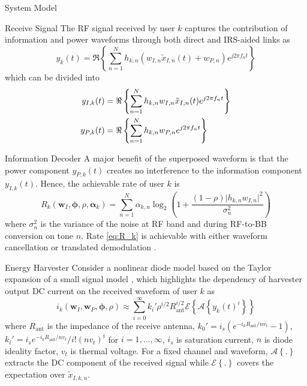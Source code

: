 \documentclass{IEEEtran}
\begin{document}
\begin{section}{System Model}
	\begin{subsection}{Receive Signal}
		The RF signal received by user $k$ captures the contribution of information and power waveforms through both direct and IRS-aided links as
		\begin{equation}\label{eq:y_k}
			y_k(t)=\Re\left\{\sum_{n=1}^N{h_{{k,n}}}\left({w_{I,n}\tilde{x}_{I,n}(t)}+w_{P,n}\right){e^{j2{\pi}{f_n}{t}}}\right\}
		\end{equation}
		which can be divided into
		\begin{align}\label{eq:y_{I/P,k}}
			y_{I,k}(t) & = \Re\left\{\sum_{n=1}^N{h_{{k,n}}}{w_{I,n}\tilde{x}_{I,n}(t)}{e^{j2{\pi}{f_n}{t}}}\right\}\\
			y_{P,k}(t) & = \Re\left\{\sum_{n=1}^N{h_{{k,n}}}w_{P,n}{e^{j2{\pi}{f_n}{t}}}\right\}
		\end{align}
	\end{subsection}

	\begin{subsection}{Information Decoder}
		A major benefit of the superposed waveform is that the power component $y_{P,k}(t)$ creates no interference to the information component $y_{I,k}(t)$. Hence, the achievable rate of user $k$ is
		\begin{equation}\label{eq:R_k}
			R_k(\boldsymbol{w}_I,\boldsymbol{\phi},\rho,\boldsymbol{\alpha}_k)=\sum_{n=1}^N\alpha_{k,n}{\log_2\left(1+\frac{(1-\rho)\lvert h_{k,n}w_{I,n} \rvert^2}{\sigma_n^2}\right)}
		\end{equation}
		where $\sigma_n^2$ is the variance of the noise at RF band and during RF-to-BB conversion on tone $n$. Rate \ref{eq:R_k} is achievable with either waveform cancellation or translated demodulation \cite{Clerckx2018b}.
	\end{subsection}

	\begin{subsection}{Energy Harvester}
		Consider a nonlinear diode model based on the Taylor expansion of a small signal model \cite{Clerckx2016a,Clerckx2018b}, which highlights the dependency of harvester output DC current on the received waveform of user $k$ as
		\begin{equation}\label{eq:i_k}
			i_k(\boldsymbol{w}_I,\boldsymbol{w}_P,\boldsymbol{\phi},\rho)\approx\sum_{i=0}^{\infty}{k_i'}{\rho^{i/2}}{R_{\text{ant}}^{i/2}}\mathcal{E}\left\{{\mathcal{A}\left\{y_k(t)^i\right\}}\right\}
		\end{equation}
		where $R_{\text{ant}}$ is the impedance of the receive antenna, $k_0'=i_s(e^{-i_kR_{\text{ant}}/nv_t}-1)$, $k_i'=i_se^{-i_kR_{\text{ant}}/nv_t}/i!(nv_t)^i$ for $i=1,\dots,\infty$, $i_s$ is saturation current, $n$ is diode ideality factor, $v_t$ is thermal voltage. For a fixed channel and waveform, $\mathcal{A}\left\{.\right\}$ extracts the DC component of the received signal while $\mathcal{E}\left\{.\right\}$ covers the expectation over $\tilde{x}_{I,k,n}$.


\end{subsection}
\end{section}
\end{document}
